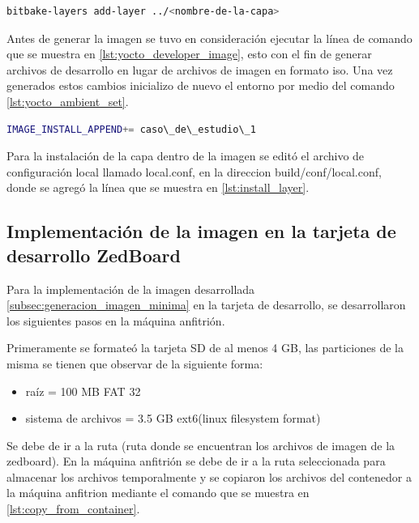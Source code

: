 \begin{lstlisting}[language=bash, caption={Generar archivos de desarrollador, Yocto }, label=lst:yocto_developer_image]
    bitbake-layers add-layer ../<nombre-de-la-capa>
\end{lstlisting}

Antes de generar la imagen se tuvo en consideración ejecutar la línea de comando que se muestra en \ref{lst:yocto_developer_image}, esto con el fin de generar archivos de desarrollo en lugar de archivos de imagen en formato iso. Una vez generados estos cambios inicializo de nuevo el entorno por medio del comando \ref{lst:yocto_ambient_set}. 

\begin{lstlisting}[language=bash, caption={Instalar la capa generada, Yocto }, label=lst:install_layer]
    IMAGE_INSTALL_APPEND+= caso\_de\_estudio\_1
\end{lstlisting}

Para la instalación de la capa dentro de la imagen se editó el archivo de configuración local llamado local.conf, en la direccion build/conf/local.conf, donde se agregó la línea que se muestra en \ref{lst:install_layer}.


\subsection{Implementación de la imagen en la tarjeta de desarrollo ZedBoard}\label{sub:image2zedboard}

Para la implementación de la imagen desarrollada \ref{subsec:generacion_imagen_minima} en la tarjeta de desarrollo, se desarrollaron los siguientes pasos en la máquina anfitrión.

Primeramente se formateó la tarjeta SD de al menos 4 GB, las particiones de la misma se tienen que observar de la siguiente forma:

\begin{itemize}
    \item raíz = 100 MB FAT 32
    \item sistema de archivos = 3.5 GB ext6(linux filesystem format)
\end{itemize} 

Se debe de ir a la ruta (ruta donde se encuentran los archivos de imagen de la zedboard). En la máquina anfitrión se debe de ir a la ruta seleccionada para almacenar los archivos temporalmente y se copiaron los archivos del contenedor a la máquina anfitrion mediante el comando que se muestra en \ref{lst:copy_from_container}.


